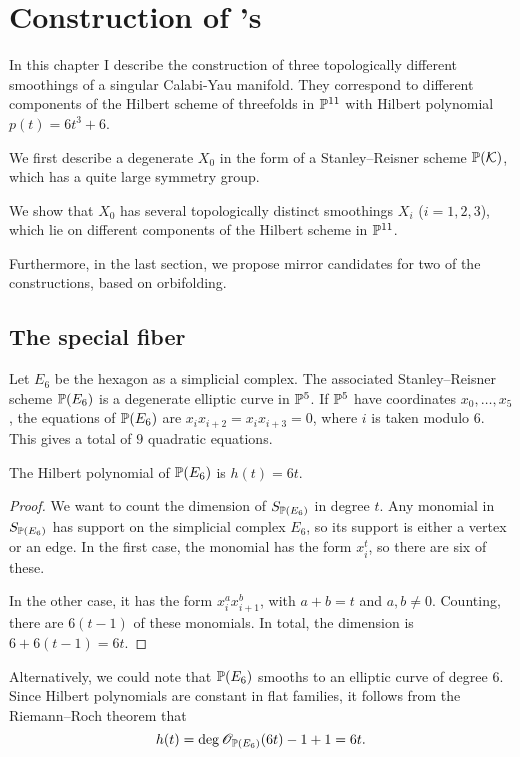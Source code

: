 \chapter{Construction of \CY's}
\label{sec:constructions}

In this chapter I describe the construction of three topologically different smoothings of a singular Calabi-Yau manifold. They correspond to different components of the Hilbert scheme of threefolds in $\P^{11}$ with Hilbert polynomial $p(t)=6t^3+6$. 

We first describe a degenerate \CY $X_0$ in the form of a Stanley--Reisner scheme $\P(\K)$, which has a quite large symmetry group.

We show that $X_0$ has several topologically distinct smoothings $X_i$ (${i=1,2,3}$), which lie on different components of the Hilbert scheme in $\P^{11}$.

Furthermore, in the last section, we propose mirror candidates for two of the constructions, based on orbifolding.

\section{The special fiber}

Let $E_6$ be the hexagon as a simplicial complex. The associated Stanley--Reisner scheme $\P(E_6)$ is a degenerate elliptic curve in $\P^5$. If $\P^5$ have coordinates $x_0,\ldots,x_5$, the equations of $\P(E_6)$ are $x_ix_{i+2}=x_ix_{i+3}=0$, where $i$ is taken modulo $6$. This gives a total of $9$ quadratic equations.

\begin{lemma}
The Hilbert polynomial of $\P(E_6)$ is $h(t)=6t$.
\end{lemma}
\begin{proof}
We want to count the dimension of $S_{\P(E_6)}$ in degree $t$. Any monomial in $S_{\P(E_6)}$ has support on the simplicial complex $E_6$, so its support is either a vertex or an edge. In the first case, the monomial has the form $x_i^t$, so there are six of these.

In the other case, it has the form $x_i^ax_{i+1}^b$, with $a+b=t$ and $a,b \neq 0$. Counting, there are $6(t-1)$ of these monomials. In total, the dimension is $6+6(t-1)=6t$.
\end{proof}
\begin{remark}
Alternatively, we could note that $\P(E_6)$ smooths to an elliptic curve of degree $6$. Since Hilbert polynomials are constant in flat families, it follows from the Riemann--Roch theorem that \[h(t)=\deg \OO_{\P(E_6)}(6t)-1+1=6t.\]
\end{remark}

